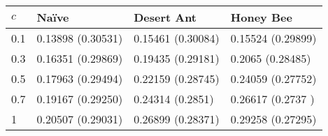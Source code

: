 \begin{tabular} {|l|l|l|l|}
\hline
$c$ & Na\"ive & Desert Ant & Honey Bee \\
\hline
0.1 &  0.13898	(0.30531)  & 0.15461	(0.30084)  & 0.15524	(0.29899)  \\
0.3 &  0.16351	(0.29869)  & 0.19435	(0.29181)  & 0.2065	(0.28485)  \\
0.5 &  0.17963	(0.29494)  & 0.22159	(0.28745)  & 0.24059	(0.27752)  \\
0.7 &  0.19167	(0.29250)  & 0.24314	(0.2851)  &  0.26617	(0.2737 )  \\
1   & 0.20507	(0.29031)  & 0.26899	(0.28371)  & 0.29258	(0.27295)  \\
\hline
\end{tabular}
